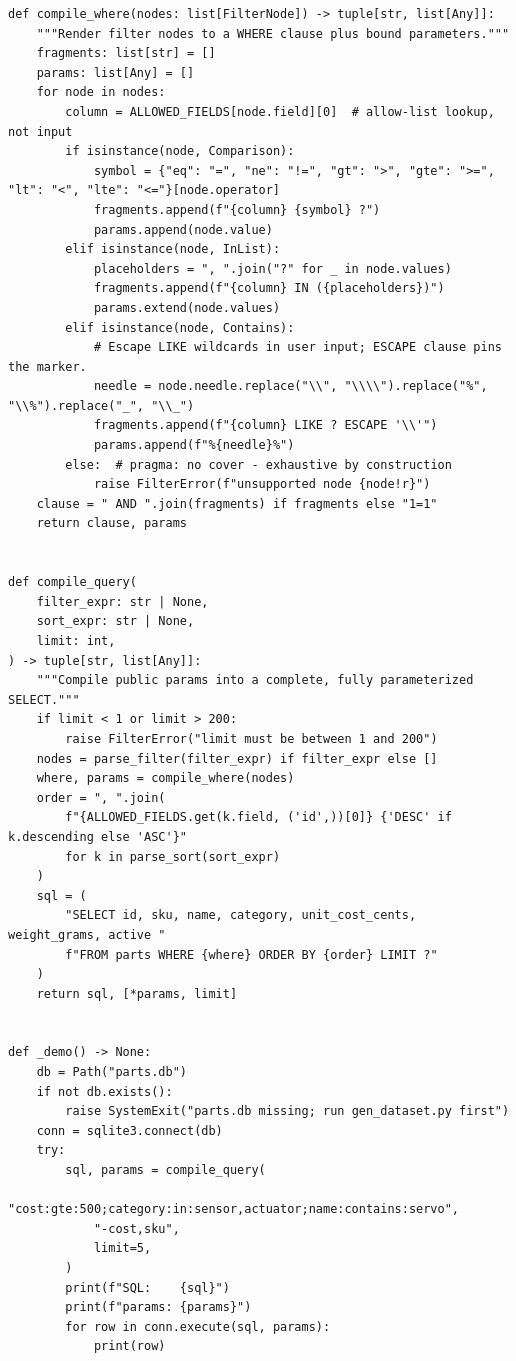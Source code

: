 \begin{verbatim}
def compile_where(nodes: list[FilterNode]) -> tuple[str, list[Any]]:
    """Render filter nodes to a WHERE clause plus bound parameters."""
    fragments: list[str] = []
    params: list[Any] = []
    for node in nodes:
        column = ALLOWED_FIELDS[node.field][0]  # allow-list lookup, not input
        if isinstance(node, Comparison):
            symbol = {"eq": "=", "ne": "!=", "gt": ">", "gte": ">=", "lt": "<", "lte": "<="}[node.operator]
            fragments.append(f"{column} {symbol} ?")
            params.append(node.value)
        elif isinstance(node, InList):
            placeholders = ", ".join("?" for _ in node.values)
            fragments.append(f"{column} IN ({placeholders})")
            params.extend(node.values)
        elif isinstance(node, Contains):
            # Escape LIKE wildcards in user input; ESCAPE clause pins the marker.
            needle = node.needle.replace("\\", "\\\\").replace("%", "\\%").replace("_", "\\_")
            fragments.append(f"{column} LIKE ? ESCAPE '\\'")
            params.append(f"%{needle}%")
        else:  # pragma: no cover - exhaustive by construction
            raise FilterError(f"unsupported node {node!r}")
    clause = " AND ".join(fragments) if fragments else "1=1"
    return clause, params


def compile_query(
    filter_expr: str | None,
    sort_expr: str | None,
    limit: int,
) -> tuple[str, list[Any]]:
    """Compile public params into a complete, fully parameterized SELECT."""
    if limit < 1 or limit > 200:
        raise FilterError("limit must be between 1 and 200")
    nodes = parse_filter(filter_expr) if filter_expr else []
    where, params = compile_where(nodes)
    order = ", ".join(
        f"{ALLOWED_FIELDS.get(k.field, ('id',))[0]} {'DESC' if k.descending else 'ASC'}"
        for k in parse_sort(sort_expr)
    )
    sql = (
        "SELECT id, sku, name, category, unit_cost_cents, weight_grams, active "
        f"FROM parts WHERE {where} ORDER BY {order} LIMIT ?"
    )
    return sql, [*params, limit]


def _demo() -> None:
    db = Path("parts.db")
    if not db.exists():
        raise SystemExit("parts.db missing; run gen_dataset.py first")
    conn = sqlite3.connect(db)
    try:
        sql, params = compile_query(
            "cost:gte:500;category:in:sensor,actuator;name:contains:servo",
            "-cost,sku",
            limit=5,
        )
        print(f"SQL:    {sql}")
        print(f"params: {params}")
        for row in conn.execute(sql, params):
            print(row)


\end{verbatim}

